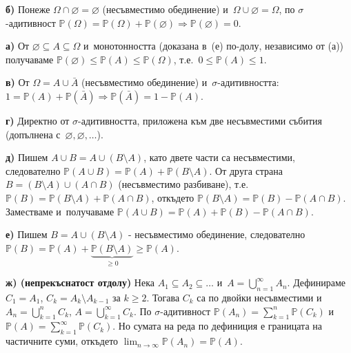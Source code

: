 \begin{proofbox}
\textbf{б)} Понеже $\Omega\cap\varnothing=\varnothing$ (несъвместимо
обединение) и~$\Omega\cup\varnothing=\Omega$, по $\sigma$-адитивност
$\mathbb P(\Omega)=\mathbb P(\Omega)+\mathbb P(\varnothing)
\Rightarrow \mathbb P(\varnothing)=0$.

\textbf{а)} От $\varnothing\subseteq A\subseteq\Omega$ и~монотонността (доказана в~(е) по-долу, независимо от (а)) получаваме
$\mathbb P(\varnothing)\le\mathbb P(A)\le\mathbb P(\Omega)$, т.е.\
$0\le\mathbb P(A)\le 1$.

\textbf{в)} От $\Omega=A\cup\bar A$ (несъвместимо обединение) и~$\sigma$-адитивността: $1=\mathbb{P}(A)+\mathbb{P}(\bar A)
\Rightarrow \mathbb{P}(\bar A)=1-\mathbb{P}(A)$.

\textbf{г)} Директно от $\sigma$-адитивността, приложена към две
несъвместими събития (допълнена с~$\varnothing,\varnothing,\dots$).

\textbf{д)} Пишем $A\cup B = A\cup(B\setminus A)$, като двете части
са несъвместими, следователно $\mathbb{P}(A\cup B)=\mathbb{P}(A)+
\mathbb{P}(B\setminus A)$. От друга страна $B=(B\setminus A)\cup(A\cap
B)$ (несъвместимо разбиване), т.е.\ $\mathbb{P}(B)=\mathbb{P}(B
\setminus A)+\mathbb{P}(A\cap B)$, откъдето $\mathbb{P}(B\setminus A)
=\mathbb{P}(B)-\mathbb{P}(A\cap B)$. Заместваме и~получаваме
$\mathbb{P}(A\cup B)=\mathbb{P}(A)+\mathbb{P}(B)-\mathbb{P}(A\cap B)$.

\textbf{е)} Пишем $B = A\cup(B\setminus A)$ - несъвместимо
обединение, следователно $\mathbb{P}(B)=\mathbb{P}(A)+
\underbrace{\mathbb{P}(B\setminus A)}_{\geq 0}\geq\mathbb{P}(A)$.

\textbf{ж) (непрекъснатост отдолу)} Нека $A_1\subseteq A_2\subseteq
\dots$ и~$A=\bigcup_{n=1}^{\infty}A_n$. Дефинираме $C_1=A_1$,
$C_k=A_k\setminus A_{k-1}$ за $k\geq 2$. Тогава $C_k$ са по двойки
несъвместими и~$A_n=\bigcup_{k=1}^{n}C_k$, $A=\bigcup_{k=1}^{\infty}
C_k$. По $\sigma$-адитивност $\mathbb P(A_n)=\sum_{k=1}^n \mathbb
P(C_k)$ и~$\mathbb P(A)=\sum_{k=1}^\infty \mathbb P(C_k)$. Но сумата
на реда по дефиниция е границата на частичните суми, откъдето
$\lim_{n\to\infty}\mathbb P(A_n)=\mathbb P(A)$.
\end{proofbox}

